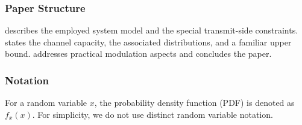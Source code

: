 








\subsubsection*{Paper Structure}
 describes the employed system model and  the special transmit-side constraints.  states the channel capacity, the associated distributions, and a familiar upper bound.  addresses practical modulation aspects and  concludes the paper.

\subsubsection*{Notation}
For a random variable $x$, the probability density function (PDF) is denoted as $f_x(x)$. For simplicity, we do not use distinct random variable notation.
